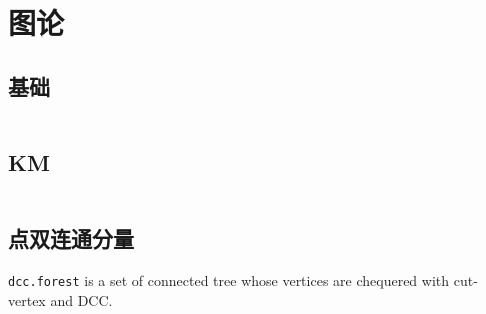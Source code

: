 \chapter{图论}
\section{基础}
\inputminted{cpp}{\source/graph-theory/basis.cpp}
\section{KM}
\inputminted{cpp}{\source/graph-theory/KM.cpp}
\section{点双连通分量}
\texttt{dcc.forest} is a set of connected tree whose vertices are chequered with cut-vertex and DCC.
\inputminted{cpp}{\source/graph-theory/double-connected-graph-vertex.cpp}
